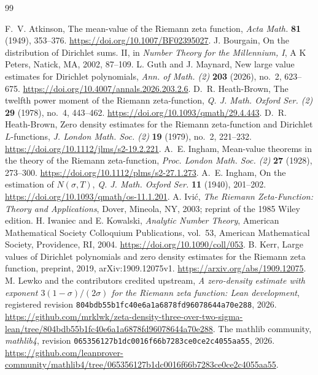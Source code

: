 \documentclass[11pt,a4paper]{article}
\numberwithin{equation}{section}
\theoremstyle{definition}
\begin{document}
\begin{thebibliography}{99}
\raggedright
{} F.~V. Atkinson, The mean-value of the Riemann zeta function,
\emph{Acta Math.} \textbf{81} (1949), 353--376.
\url{https://doi.org/10.1007/BF02395027}.
 J. Bourgain, On the distribution of Dirichlet sums. II,
in \emph{Number Theory for the Millennium, I}, A K Peters, Natick, MA, 2002,
87--109.
 L. Guth and J. Maynard, New large value estimates for Dirichlet polynomials,
\emph{Ann. of Math. (2)} \textbf{203} (2026), no.~2, 623--675.
\url{https://doi.org/10.4007/annals.2026.203.2.6}.
 D.~R. Heath-Brown, The twelfth power moment of the Riemann zeta-function,
\emph{Q. J. Math. Oxford Ser. (2)} \textbf{29} (1978), no.~4, 443--462.
\url{https://doi.org/10.1093/qmath/29.4.443}.
 D.~R. Heath-Brown, Zero density estimates for the Riemann zeta-function
and Dirichlet $L$-functions, \emph{J. London Math. Soc. (2)} \textbf{19} (1979),
no.~2, 221--232. \url{https://doi.org/10.1112/jlms/s2-19.2.221}.
 A.~E. Ingham, Mean-value theorems in the theory of the Riemann
zeta-function, \emph{Proc. London Math. Soc. (2)} \textbf{27} (1928), 273--300.
\url{https://doi.org/10.1112/plms/s2-27.1.273}.
 A.~E. Ingham, On the estimation of $N(\sigma,T)$,
\emph{Q. J. Math. Oxford Ser.} \textbf{11} (1940), 201--202.
\url{https://doi.org/10.1093/qmath/os-11.1.201}.
 A. Ivi\'c, \emph{The Riemann Zeta-Function: Theory and Applications},
Dover, Mineola, NY, 2003; reprint of the 1985 Wiley edition.
 H. Iwaniec and E. Kowalski, \emph{Analytic Number Theory},
American Mathematical Society Colloquium Publications, vol.~53,
American Mathematical Society, Providence, RI, 2004.
\url{https://doi.org/10.1090/coll/053}.
 B. Kerr, Large values of Dirichlet polynomials and zero density
estimates for the Riemann zeta function, preprint, 2019,
arXiv:1909.12075v1. \url{https://arxiv.org/abs/1909.12075}.
 M. Lewko and the contributors credited upstream,
\emph{A zero-density estimate with exponent $3(1-\sigma)/(2\sigma)$ for the
Riemann zeta function: Lean development}, registered revision
\texttt{804bdb55b1fc40e6a1a6878fd96078644a70e288}, 2026.
\url{https://github.com/mrklwk/zeta-density-three-over-two-sigma-lean/tree/804bdb55b1fc40e6a1a6878fd96078644a70e288}.
 The mathlib community, \emph{mathlib4}, revision
\texttt{065356127b1dc0016f66b7283ce0ce2c4055aa55}, 2026.
\url{https://github.com/leanprover-community/mathlib4/tree/065356127b1dc0016f66b7283ce0ce2c4055aa55}.

\end{thebibliography}
\end{document}
